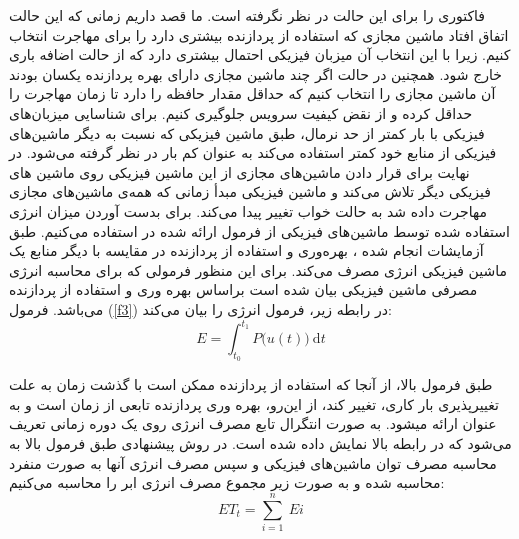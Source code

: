  فاکتوری را برای این حالت در نظر نگرفته است. ما قصد داریم زمانی که این حالت اتفاق افتاد ماشین مجازی که استفاده از پردازنده بیشتری دارد را برای مهاجرت انتخاب کنیم. زیرا با این انتخاب آن میزبان فیزیکی احتمال بیشتری دارد که از حالت اضافه باری خارج شود. همچنین در حالت
 اگر چند ماشین مجازی دارای بهره پردازنده یکسان بودند آن ماشین مجازی را انتخاب کنیم که حداقل مقدار حافظه را دارد تا زمان مهاجرت را حداقل کرده و از نقض کیفیت سرویس جلوگیری کنیم.
برای شناسایی میزبان‌های فیزیکی با بار کمتر از حد نرمال، طبق 
\cite{num15}
ماشین فیزیکی که نسبت به دیگر ماشین‌های فیزیکی از منابع خود کمتر استفاده می‌کند به عنوان کم بار در نظر گرفته می‌شود. در نهایت برای قرار دادن ماشین‌های مجازی از این ماشین فیزیکی روی ماشین ‌های فیزیکی دیگر تلاش می‌کند و ماشین فیزیکی مبدأ زمانی که همه‌ی ماشین‌های مجازی مهاجرت داده شد به حالت خواب تغییر پیدا می‌کند.
برای بدست آوردن میزان انرژی استفاده شده توسط ماشین‌های فیزیکی از  فرمول ارائه شده در  
\cite{num15}
استفاده می‌کنیم­. طبق آزمایشات انجام شده ، بهره‌وری و استفاده از پردازنده در مقایسه با دیگر منابع یک ماشین فیزیکی انرژی مصرف می‌کند. برای این منظور فرمولی که برای محاسبه انرژی مصرفی ماشین فیزیکی بیان شده است براساس بهره وری و استفاده از پردازنده می‌باشد. فرمول
(\ref{f3})
 در رابطه زیر، فرمول انرژی را بیان می‌کند­:
\cite{num15}
\begin{equation}
E=\int_{t_0}^{t_1}P\Big(u(t)\Big)\:\mathrm{d}t
\label{f3}
\end{equation}
 
طبق فرمول بالا، از آنجا  که استفاده از پردازنده ممکن است با گذشت زمان به علت تغییرپذیری بار کاری­، تغییر کند­، از این‌رو، بهره وری پردازنده تابعی از زمان است و به عنوان 
ارائه می­شود­.
 به صورت انتگرال تابع مصرف انرژی روی یک دوره زمانی تعریف می‌شود که در رابطه بالا نمایش داده شده است. در روش پیشنهادی طبق فرمول بالا به محاسبه مصرف توان ماشین‌های فیزیکی و سپس مصرف انرژی آنها به صورت منفرد محاسبه شده و به صورت زیر مجموع مصرف انرژی ابر را محاسبه می‌کنیم:
\cite{num15}
\begin{equation}
ET_t = \sum_{i=1}^{n}\:Ei
\label{f4}
\end{equation}


